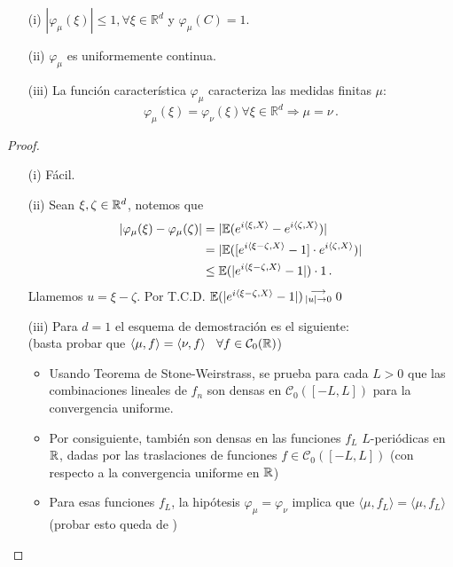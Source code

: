 \begin{property}
\beforeitemize
\begin{itemize}
    \item[(i)] $|\varphi_\mu(\xi)|\leq 1,  \forall \xi \in\mathbb{R}^d$ y $\varphi_\mu(C)=1$.
    \item[(ii)] $\varphi_\mu$ es uniformemente continua.
    \item[(iii)] La función característica $\varphi_\mu$ caracteriza las medidas finitas $\mu$:
    $$ \varphi_\mu(\xi)=\varphi_\nu(\xi) \forall \xi\in\mathbb{R}^d\Longrightarrow\mu=\nu \, .$$
\end{itemize}
\end{property}
\begin{proof}
\gris
\beforeitemize
\begin{itemize}
    \item[(i)] Fácil.
    \item[(ii)] Sean $\xi,\zeta\in\mathbb{R}^d$, notemos que
    \begin{alignat*}{2}
        |\varphi_\mu(\xi)-\varphi_\mu(\zeta)| & = |\mathbb{E}(e^{i\langle\xi,X\rangle}-e^{i\langle\zeta,X\rangle})| \\
         & = |\mathbb{E}([e^{i\langle\xi-\zeta,X\rangle}-1]\cdot e^{i\langle\zeta,X\rangle})| \\
         & \leq \mathbb{E}(|e^{i\langle\xi-\zeta,X\rangle}-1|)\cdot 1 \, .
    \end{alignat*}
    Llamemos $u=\xi-\zeta$. Por T.C.D. $\mathbb{E}(|e^{i\langle\xi-\zeta,X\rangle}-1|)\,\substack{\longrightarrow \\ |u|\to 0}\mbox{ }0$
    \item[(iii)]
    Para $d=1$ el esquema de demostración es el siguiente: %
    \\ (basta probar que $\langle \mu,f\rangle = \langle\nu,f\rangle \hspace{.25cm}\, \forall f\in\mathcal{C}_0(\mathbb{R})$)
    \begin{itemize}
        \item Usando Teorema de Stone-Weirstrass, se prueba para cada $L>0$ que las combinaciones lineales de $f_n$ son densas en $\mathcal{C}_0([-L,L])$ para la convergencia uniforme.
        \item Por consiguiente, también son densas en las funciones $f_L$ $L$-periódicas en $\mathbb{R}$, dadas por las traslaciones de funciones $f\in\mathcal{C}_0([-L,L])$ (con respecto a la convergencia uniforme en $\mathbb{R}$)
        \item Para esas funciones $f_L$, la hipótesis $\varphi_\mu=\varphi_\nu$ implica que $\langle\mu,f_L\rangle=\langle\mu,f_L\rangle$ (probar esto queda de \ejercicio\gris)

\end{itemize}
\end{itemize}
\end{proof}

